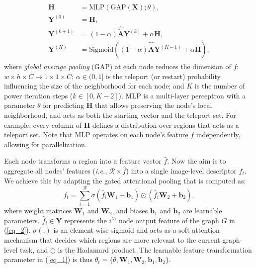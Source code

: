 \documentclass[journal]{IEEEtran}
\begin{document}
\begin{equation}
\begin{split}
\begin{aligned}
    \mathbf{H} &= \text{MLP}\left(\text{GAP}(\mathbf{X});\theta\right), \\
    \mathbf{Y}^{(0)} &= \mathbf{H}, \\
    \mathbf{Y}^{(k+1)} &= (1-\alpha)\hat{\tilde{\mathbf{A}}}\mathbf{Y}^{(k)}+\alpha \mathbf{H},\\
    \mathbf{Y}^{(K)}&= \text{Sigmoid} \left( (1-\alpha)\hat{\tilde{\mathbf{A}}}\mathbf{Y}^{(K-1)}+\alpha \mathbf{H}\right),
    \end{aligned}
\end{split}
\label{eq_2}
\end{equation} 
where \textit{global average pooling} (GAP) at each node reduces the dimension of $f$: $w\times h\times C \rightarrow 1\times 1\times C$; $\alpha \in(0,1]$ is the teleport (or restart) probability influencing the size of the neighborhood for each node; and $K$ is the number of power iteration steps ($k \in [0,K-2]$). MLP is a multi-layer perceptron with a parameter $\theta$ for predicting $\mathbf{H}$ that allows preserving the node’s local neighborhood, and acts as both the starting vector and the teleport set. For example, every column of $\mathbf{H}$ defines a distribution over regions that acts as a teleport set. Note that MLP operates on each node’s feature $f$ independently, allowing for parallelization. 

Each node transforms a region into a feature vector $\hat{f}$. Now the aim is to aggregate all nodes' features (\textit{i.e.}, $\mathcal{R}\times \hat{f}$) into a single image-level descriptor $f_t$. We achieve this by adapting the gated attentional pooling \cite{li2016gated} that is computed as:\vspace{-.12cm}
\begin{equation}
    f_t = \sum_{i=1}^{\mathcal{R}} \sigma(\hat{f}_i \mathbf{W}_1+\mathbf{b}_1)\odot (\hat{f}_i \mathbf{W}_2+\mathbf{b}_2),
    \label{eq_3}
\end{equation}
where weight matrices $\mathbf{W}_1$ and $\mathbf{W}_2$, and biases $\mathbf{b}_1$ and $\mathbf{b}_2$ are learnable parameters. $\hat{f}_i\in\mathbf{Y}$ represents the $i^{th}$ node output feature of the graph $G$ in (\ref{eq_2}). $\sigma(.)$ is an element-wise sigmoid and acts as a soft attention mechanism that decides which regions are more relevant to the current graph-level task, and $\odot$ is the Hadamard product. The learnable feature transformation parameter in (\ref{eq_1}) is thus $\theta_t=\{\theta, \mathbf{W}_1, \mathbf{W}_2, \mathbf{b}_1,\mathbf{b}_2\}$. 
\end{document}
